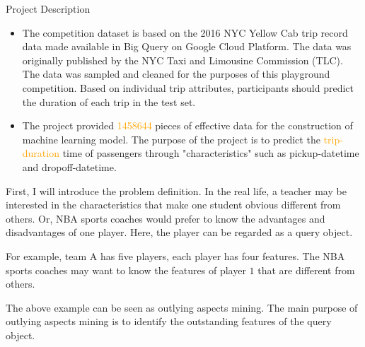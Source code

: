 \documentclass[
 size=14pt,
 paper=smartboard,  %
 mode=present, 		%
 display=slides, 	%
 style=tuliplab,  	%
 pauseslide,
 fleqn,leqno]{powerdot}
\begin{document}
\begin{slide}{Project Description}

\begin{itemize}
\item The competition dataset is based on the 2016 NYC Yellow Cab trip record data made available in Big Query on Google Cloud Platform. The data was originally published by the NYC Taxi and Limousine Commission (TLC). The data was sampled and cleaned for the purposes of this playground competition. Based on individual trip attributes, participants should predict the duration of each trip in the test set.

\item The project provided \textcolor{orange}{1458644} pieces of effective data for the construction of machine learning model. The purpose of the project is to predict the \textcolor{orange}{trip-duration} time of passengers through "characteristics" such as pickup-datetime and dropoff-datetime.
\end{itemize}




\begin{note}
First, I will introduce the problem definition.
In the real life,
a teacher may be interested in the characteristics that
make one student obvious different from others.
Or,
NBA sports coaches would prefer to
know the advantages and disadvantages of one player.
Here, the player can be regarded as a query object.

For example, team A has five players,
each player has four features.
The NBA sports coaches may want to know the features of
player $1$ that are different from others.

The above example can be seen as outlying aspects mining.
The main purpose of outlying aspects mining is to identify
the outstanding features of the query object.



\end{note}

\end{slide}



\end{document}
